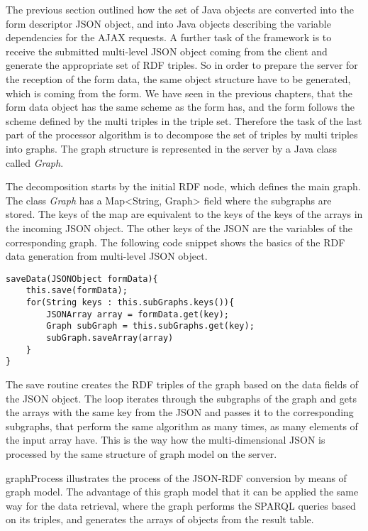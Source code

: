 The previous section outlined how the set of Java objects are converted into the form descriptor JSON object, and into Java objects describing the variable dependencies for the AJAX requests. A further task of the framework is to receive the submitted multi-level JSON object coming from the client and generate the appropriate set of RDF triples. So in order to prepare the server for the reception of the form data, the same object structure have to be generated, which is coming from the form. We have seen in the previous chapters, that the form data object has the same scheme as the form has, and the form follows the scheme defined by the multi triples in the triple set. Therefore the task of the last part of the processor algorithm is to decompose the set of triples by multi triples into graphs. The graph structure is represented in the server by a Java class called \textit{Graph}.


The decomposition starts by the initial RDF node, which defines the main graph. The class \textit{Graph} has a Map<String, Graph> field where the subgraphs are stored. The keys of the map are equivalent to the keys of the keys of the arrays in the incoming JSON object. The other keys of the JSON are the variables of the corresponding graph. The following code snippet shows the basics of the RDF data generation from multi-level JSON object. 

\begin{lstlisting}[basicstyle=\footnotesize, frame=single, caption={Saving routine in Java}, label=dataGeneration captionpos=b, belowskip=1em, aboveskip=2em]
saveData(JSONObject formData){
	this.save(formData);
	for(String keys : this.subGraphs.keys()){
		JSONArray array = formData.get(key);
		Graph subGraph = this.subGraphs.get(key);
		subGraph.saveArray(array)					
	}
}
\end{lstlisting}

The save routine creates the RDF triples of the graph based on the data fields of the JSON object. The loop iterates through the subgraphs of the graph and gets the arrays with the same key from the JSON and passes it to the corresponding subgraphs, that perform the same algorithm as many times, as many elements of the input array have. This is the way how the multi-dimensional JSON is processed by the same structure of graph model on the server.

\figurename{graphProcess} illustrates the process of the JSON-RDF conversion by means of graph model. The advantage of this graph model that it can be applied the same way for the data retrieval, where the graph performs the SPARQL queries based on its triples, and generates the arrays of objects from the result table. 

